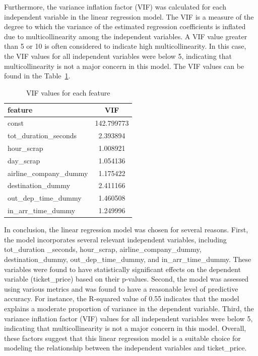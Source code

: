 Furthermore, the variance inflation factor (VIF) was calculated for each independent variable in the linear regression model.
The VIF is a measure of the degree to which the variance of the estimated regression coefficients is inflated due to multicollinearity among the independent variables.
A VIF value greater than 5 or 10 is often considered to indicate high multicollinearity. In this case, the VIF values for all independent variables were below 5, indicating that multicollinearity is not a major concern in this model. 
The VIF values can be found in the Table~\ref{tab:vif}.
\begin{table}[H]
  \centering
  \begin{tabular}{l c}
  \hline
  \textbf{feature} & \textbf{VIF} \\
  \hline
  const & 142.799773 \\
  tot\_duration\_seconds & 2.393894 \\
  hour\_scrap & 1.008921 \\
  day\_scrap & 1.054136 \\
  airline\_company\_dummy & 1.175422 \\
  destination\_dummy & 2.411166 \\
  out\_dep\_time\_dummy & 1.460508 \\
  in\_arr\_time\_dummy & 1.249996 \\
  \hline
  \end{tabular}
  \caption{VIF values for each feature}
  \label{tab:vif}
\end{table}

In conclusion, the linear regression model was chosen for several reasons.
First, the model incorporates several relevant independent variables, including tot\_duration
\_seconds, hour\_scrap, airline\_company\_dummy, destination\_dummy, out\_dep\_time\_dummy, and in\_arr\_time\_dummy.
These variables were found to have statistically significant effects on the dependent variable (ticket\_price) based on their p-values.
Second, the model was assessed using various metrics and was found to have a reasonable level of predictive accuracy. 
For instance, the R-squared value of 0.55 indicates that the model explains a moderate proportion of variance in the dependent variable.
Third, the variance inflation factor (VIF) values for all independent variables were below 5, indicating that multicollinearity is not a major concern in this model.
Overall, these factors suggest that this linear regression model is a suitable choice for modeling the relationship between the independent variables and ticket\_price.

